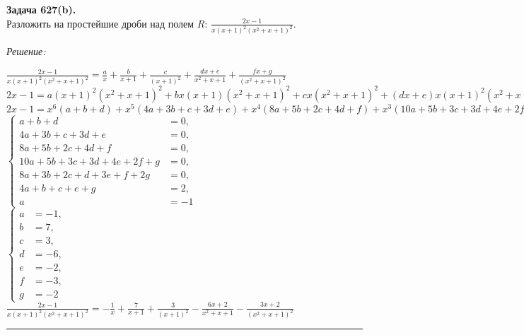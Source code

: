 \documentclass[a4paper, 12pt]{article}
\newenvironment{problem}[2][Задача]
    { \begin{mdframed}[backgroundcolor=gray!10] \textbf{#1 #2.} \\}
    {  \end{mdframed}}
\newenvironment{solution}
    {\textit{Решение: }}
    {\noindent\rule{7in}{1.5pt}}
\begin{document}
\begin{problem}{627(b)}
Разложить на простейшие дроби над полем $R$:
$\frac{2x-1}{x(x+1)^2(x^2+x+1)^2}$.
\end{problem}
\begin{solution}

$\displaystyle \frac{2x-1}{x(x+1)^2(x^2+x+1)^2} = \frac{a}{x} + \frac{b}{x + 1} + \frac{c}{(x + 1)^2} + \frac{dx + e}{x^2 + x + 1} + \frac{fx + g}{(x^2 + x + 1)^2}$
\\
$\displaystyle 2x-1 = a(x+1)^2(x^2+x+1)^2 + bx(x+1)(x^2+x+1)^2 + cx(x^2+x+1)^2 + (dx+e)x(x+1)^2(x^2+x+1)+(fx+g)x(x+1)^2$
\\
$\displaystyle 2x-1 = x^6(a+b+d)+x^5(4a+3b+c+3d+e)+x^4(8a+5b+2c+4d+f)+x^3(10a+5b+3c+3d+4e+2f+g)+x^2(8a+3b+2c+d+3e+f+2g)+x(4a+b+c+e+g)+a$
\\
$
\left\{
\begin{aligned}
    a + b + d &= 0,\\
    4a + 3b + c + 3d + e &= 0,\\
    8a + 5b + 2c + 4d + f &= 0,\\
    10a + 5b + 3c + 3d + 4e + 2f + g &= 0,\\
    8a + 3b + 2c + d + 3e + f + 2g &= 0,\\
    4a + b + c + e + g &= 2,\\
    a &= -1
\end{aligned}
\right.
$
\\
$
\left\{
\begin{aligned}
    a &= -1,\\
    b &= 7,\\
    c &= 3,\\
    d &= -6,\\
    e &= -2,\\
    f &= -3,\\
    g &= -2
\end{aligned}
\right.
$
\\
$\displaystyle \frac{2x-1}{x(x+1)^2(x^2+x+1)^2} = -\frac{1}{x} + \frac{7}{x + 1} + \frac{3}{(x+1)^2} - \frac{6x + 2}{x^2 + x + 1} - \frac{3x + 2}{(x^2 + x + 1)^2}$

\end{solution}
\end{document}
